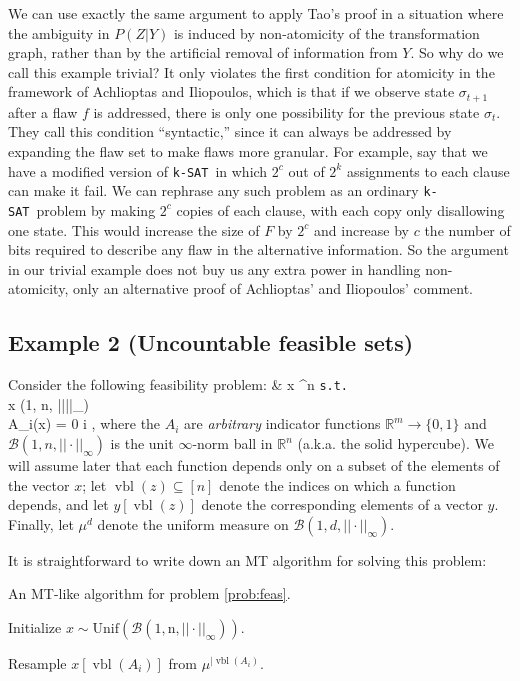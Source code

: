 \documentclass[twocolumn]{article}
\newcommand{\ksat}{\texttt{k-SAT}~}
\def\seqn#1\eeqn{\begin{align}#1\end{align}}
\newcommand{\hasDist}%
  {\sim}
\newcommand{\Reals}%
  {\mathbb{R}}
\begin{document}
We can use exactly the same argument to apply Tao's proof in a situation where the ambiguity in $P(Z | Y)$ is induced by non-atomicity of the transformation graph, rather than by the artificial removal of information from $Y$.  So why do we call this example trivial?  It only violates the first condition for atomicity in the framework of Achlioptas and Iliopoulos, which is that if we observe state $\sigma_{t+1}$ after a flaw $f$ is addressed, there is only one possibility for the previous state $\sigma_t$.  They call this condition ``syntactic,'' since it can always be addressed by expanding the flaw set to make flaws more granular.  For example, say that we have a modified version of \ksat in which $2^c$ out of $2^k$ assignments to each clause can make it fail.  We can rephrase any such problem as an ordinary \ksat problem by making $2^c$ copies of each clause, with each copy only disallowing one state.  This would increase the size of $F$ by $2^c$ and increase by $c$ the number of bits required to describe any flaw in the alternative information.  So the argument in our trivial example does not buy us any extra power in handling non-atomicity, only an alternative proof of Achlioptas' and Iliopoulos' comment.

\subsection{Example 2 (Uncountable feasible sets)}
\label{subsec:uncountable}
Consider the following feasibility problem:
\seqn
  \label{prob:feas}
   & x \in \Reals^n \texttt{s.t.} \\
  x \in {}(1, n, ||\cdot||_\infty) \\
  A_i(x) = 0 \forall i \in [m] ,
\eeqn
where the $A_i$ are \emph{arbitrary} indicator functions $\Reals^{m} \to \{0,1\}$ and $\mathcal{B}(1, n, ||\cdot||_\infty)$ is the unit $\infty$-norm ball in $\Reals^n$ (a.k.a. the solid hypercube).  We will assume later that each function depends only on a subset of the elements of the vector $x$; let $\operatorname{vbl}(z) \subseteq [n]$ denote the indices on which a function depends, and let $y[\operatorname{vbl}(z)]$ denote the corresponding elements of a vector $y$.  Finally, let $\mu^d$ denote the uniform measure on $\mathcal{B}(1, d, ||\cdot||_\infty)$.

It is straightforward to write down an MT algorithm for solving this problem:

\begin{algorithm}[H]
\caption{An MT-like algorithm for problem \ref{prob:feas}.}
\label{alg:mt-feas}
\begin{algorithmic}[1]

\State Initialize $x \hasDist \operatorname{Unif(\mathcal{B}(1, n, ||\cdot||_\infty))}$.
\EndFor

    \Return
  \EndIf
  \State Resample $x[\operatorname{vbl}(A_i)]$ from $\mu^{|\operatorname{vbl}(A_i)}$.
  \EndFor
\EndFunction

\end{algorithmic}
\end{algorithm}
\end{document}
